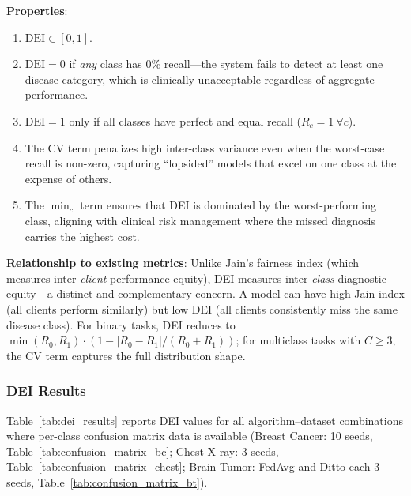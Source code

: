 \documentclass[conference]{IEEEtran}
\begin{document}
\textbf{Properties}:
\begin{enumerate}
    \item $\text{DEI} \in [0, 1]$.
    \item $\text{DEI} = 0$ if \textit{any} class has 0\% recall---the system fails to detect at least one disease category, which is clinically unacceptable regardless of aggregate performance.
    \item $\text{DEI} = 1$ only if all classes have perfect and equal recall ($R_c = 1\ \forall c$).
    \item The $\text{CV}$ term penalizes high inter-class variance even when the worst-case recall is non-zero, capturing ``lopsided'' models that excel on one class at the expense of others.
    \item The $\min_c$ term ensures that DEI is dominated by the worst-performing class, aligning with clinical risk management where the missed diagnosis carries the highest cost.
\end{enumerate}

\textbf{Relationship to existing metrics}: Unlike Jain's fairness index (which measures inter-\textit{client} performance equity), DEI measures inter-\textit{class} diagnostic equity---a distinct and complementary concern. A model can have high Jain index (all clients perform similarly) but low DEI (all clients consistently miss the same disease class). For binary tasks, DEI reduces to $\min(R_0, R_1) \cdot (1 - |R_0 - R_1|/(R_0 + R_1))$; for multiclass tasks with $C \geq 3$, the CV term captures the full distribution shape.

\subsubsection{DEI Results}

Table~\ref{tab:dei_results} reports DEI values for all algorithm--dataset combinations where per-class confusion matrix data is available (Breast Cancer: 10 seeds, Table~\ref{tab:confusion_matrix_bc}; Chest X-ray: 3 seeds, Table~\ref{tab:confusion_matrix_chest}; Brain Tumor: FedAvg and Ditto each 3 seeds, Table~\ref{tab:confusion_matrix_bt}).
\end{document}

